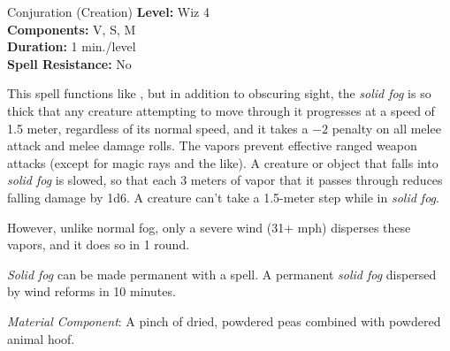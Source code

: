 {Conjuration (Creation)}
{
	\textbf{Level:}
	Wiz 4\\
	\textbf{Components:}
	V, S, M\\
	\textbf{Duration:}
	1 min./level\\
	\textbf{Spell Resistance:}
	No\\
}
{
	This spell functions like , but in addition to obscuring sight, the \emph{solid fog} is so thick that any creature attempting to move through it progresses at a speed of 1.5 meter, regardless of its normal speed, and it takes a $-2$ penalty on all melee attack and melee damage rolls. The vapors prevent effective ranged weapon attacks (except for magic rays and the like). A creature or object that falls into \emph{solid fog} is slowed, so that each 3 meters of vapor that it passes through reduces falling damage by 1d6. A creature can't take a 1.5-meter step while in \emph{solid fog}.

	However, unlike normal fog, only a severe wind (31+ mph) disperses these vapors, and it does so in 1 round.

	\emph{Solid fog} can be made permanent with a  spell. A permanent \emph{solid fog} dispersed by wind reforms in 10 minutes.

	\textit{Material Component}:
	A pinch of dried, powdered peas combined with powdered animal hoof.

}
